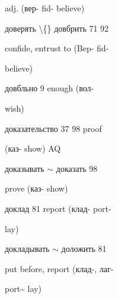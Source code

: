 \begin{minipage}[t]{0.475\textwidth}
\noindent adj. (вер- fid- believe)\par
\noindent доверять \textbackslash\{\} довбрить 71 92\par
\noindent confide, entrust to (Bep- fid-\par
\noindent believe)\par
\noindent довбльно 9 enough (вол-\par
\noindent wish)\par
\noindent доказательство 37 98 proof\par
\noindent (каз- show) AQ\par
\noindent доказывать $\sim$ доказать 98\par
\noindent prove (каз- show)\par
\noindent доклад 81 report (клад- port-\par
\noindent lay)\par
\noindent докладывать $\sim$ доложить 81\par
\noindent put before, report (клад-, лаг-\par
\noindent port\textasciitilde{} lay)\par
\end{minipage}\hfill
